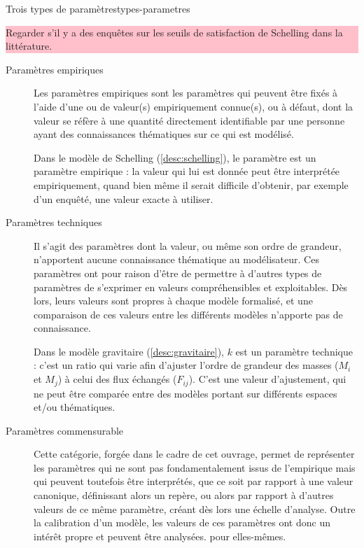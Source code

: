 \documentclass[12pt, a4paper, oneside]{book}
\begin{document}
	
	\begin{encadre}{Trois types de paramètres}{types-parametres}
		
		\colorbox{pink}{\parbox{0.9\textwidth}{%
				\vskip5pt
				Regarder s'il y a des enquêtes sur les seuils de satisfaction de Schelling dans la littérature.
				\vskip5pt
			}
		}
	
		\begin{description}
			\item[Paramètres empiriques] Les paramètres empiriques sont les paramètres qui peuvent être fixés à l'aide d'une ou de valeur(s) empiriquement connue(s), ou à défaut, dont la valeur se réfère à une quantité directement identifiable par une personne ayant des connaissances thématiques sur ce qui est modélisé.
			\begin{mdframed}[backgroundcolor=gray!10,footnoteinside=false]
				Dans le modèle de Schelling (\ref{desc:schelling}), le paramètre  est un paramètre empirique : la valeur qui lui est donnée peut être interprétée empiriquement, quand bien même il serait difficile d'obtenir, par exemple d'un enquêté, une valeur exacte à utiliser.
			\end{mdframed}
			\item[Paramètres techniques] Il s'agit des paramètres dont la valeur, ou même son ordre de grandeur, n'apportent aucune connaissance thématique au modélisateur. Ces paramètres ont pour raison d'être de permettre à d'autres types de paramètres de s'exprimer en valeurs compréhensibles et exploitables. Dès lors, leurs valeurs sont propres à chaque modèle formalisé, et une comparaison de ces valeurs entre les différents modèles n'apporte pas de connaissance.
			
			\begin{mdframed}[backgroundcolor=gray!10,footnoteinside=false]
				Dans le modèle gravitaire (\cref{desc:gravitaire}), $k$ est un paramètre technique : c'est un ratio qui varie afin d'ajuster l'ordre de grandeur des masses ($M_i$ et $M_j$) à celui des flux  échangés ($F_{ij}$). C'est une valeur d'ajustement, qui ne peut être comparée entre des modèles portant sur différents espaces et/ou thématiques\footnotemark.
			\end{mdframed}
			
			\item[Paramètres \og commensurable \fg{}]
			
			Cette catégorie, forgée dans le cadre de cet ouvrage, permet de représenter les paramètres qui ne sont pas fondamentalement issus de l'empirique mais qui peuvent toutefois être interprétés, que ce soit par rapport à une valeur canonique, définissant alors un repère, ou alors par rapport à d'autres valeurs de ce même paramètre, créant dès lors une échelle d'analyse. Outre la calibration d'un modèle, les valeurs de ces paramètres ont donc un intérêt propre et peuvent être analysées. pour elles-mêmes.
			

\end{description}
\end{encadre}
\end{document}
